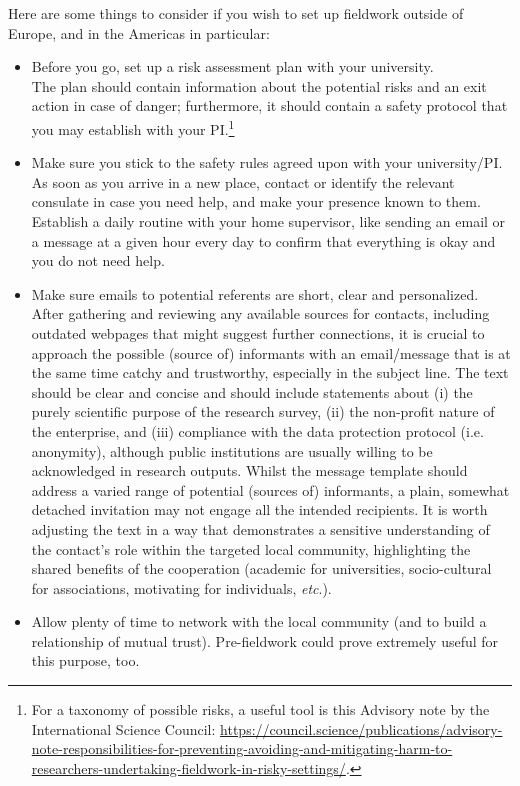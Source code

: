 \documentclass[output=paper,hidelinks]{langscibook}
\begin{document}
Here are some things to consider if you wish to set up fieldwork outside of Europe, and in the Americas in particular:
\begin{itemize}
\item Before you go, set up a risk assessment plan with your university.\\
The plan should contain information about the potential risks and an exit action in case of danger; furthermore, it should contain a safety protocol that you may establish with your PI.\footnote{For a taxonomy of possible risks, a useful tool is this Advisory note by the International Science Council: \url{https://council.science/publications/advisory-note-responsibilities-for-preventing-avoiding-and-mitigating-harm-to-researchers-undertaking-fieldwork-in-risky-settings/}.}
\item Make sure you stick to the safety rules agreed upon with your university/PI.\\
As soon as you arrive in a new place, contact or identify the relevant consulate in case you need help, and make your presence known to them. Establish a daily routine with your home supervisor, like sending an email or a message at a given hour every day to confirm that everything is okay and you do not need help.
\item Make sure emails to potential referents are short, clear and personalized.\\
After gathering and reviewing any available sources for contacts, including outdated webpages that might suggest further connections, it is crucial to approach the possible (source of) informants with an email/message that is at the same time catchy and trustworthy, especially in the subject line. The text should be clear and concise and should include statements about (i) the purely scientific purpose of the research survey, (ii) the non-profit nature of the enterprise, and (iii) compliance with the data protection protocol (i.e. anonymity), although public institutions are usually willing to be acknowledged in research outputs. Whilst the message template should address a varied range of potential (sources of) informants, a plain, somewhat detached invitation may not engage all the intended recipients. It is worth adjusting the text in a way that demonstrates a sensitive understanding of the contact’s role within the targeted local community, highlighting the shared benefits of the cooperation (academic for universities, socio-cultural for associations, motivating for individuals, \textit{etc}.).
\item Allow plenty of time to network with the local community (and to build a relationship of mutual trust). Pre-fieldwork could prove extremely useful for this purpose, too.\\

\end{itemize}
\end{document}
